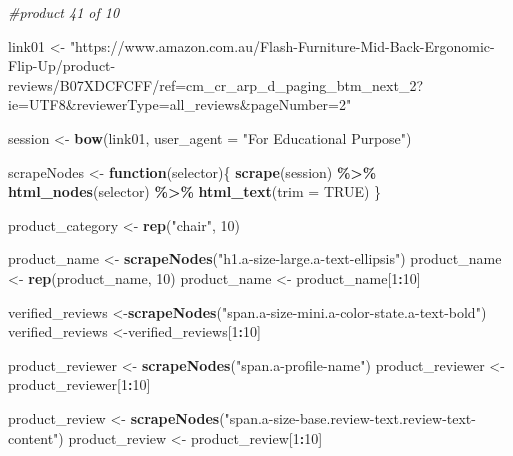 \documentclass[
]{article}
\newenvironment{Shaded}{\begin{snugshade}}{\end{snugshade}}
\newcommand{\AttributeTok}[1]{\textcolor[rgb]{0.13,0.29,0.53}{#1}}
\newcommand{\CommentTok}[1]{\textcolor[rgb]{0.56,0.35,0.01}{\textit{#1}}}
\newcommand{\ConstantTok}[1]{\textcolor[rgb]{0.56,0.35,0.01}{#1}}
\newcommand{\ControlFlowTok}[1]{\textcolor[rgb]{0.13,0.29,0.53}{\textbf{#1}}}
\newcommand{\DecValTok}[1]{\textcolor[rgb]{0.00,0.00,0.81}{#1}}
\newcommand{\FunctionTok}[1]{\textcolor[rgb]{0.13,0.29,0.53}{\textbf{#1}}}
\newcommand{\NormalTok}[1]{#1}
\newcommand{\OtherTok}[1]{\textcolor[rgb]{0.56,0.35,0.01}{#1}}
\newcommand{\SpecialCharTok}[1]{\textcolor[rgb]{0.81,0.36,0.00}{\textbf{#1}}}
\newcommand{\StringTok}[1]{\textcolor[rgb]{0.31,0.60,0.02}{#1}}
\begin{document}
\begin{Shaded}
\begin{Highlighting}[]
\CommentTok{\#product 41 of 10}

\NormalTok{link01 }\OtherTok{\textless{}{-}} \StringTok{"https://www.amazon.com.au/Flash{-}Furniture{-}Mid{-}Back{-}Ergonomic{-}Flip{-}Up/product{-}reviews/B07XDCFCFF/ref=cm\_cr\_arp\_d\_paging\_btm\_next\_2?ie=UTF8\&reviewerType=all\_reviews\&pageNumber=2"}


\NormalTok{  session }\OtherTok{\textless{}{-}} \FunctionTok{bow}\NormalTok{(link01,}
               \AttributeTok{user\_agent =} \StringTok{"For Educational Purpose"}\NormalTok{)}

\NormalTok{  scrapeNodes }\OtherTok{\textless{}{-}} \ControlFlowTok{function}\NormalTok{(selector)\{}
    \FunctionTok{scrape}\NormalTok{(session) }\SpecialCharTok{\%\textgreater{}\%}
      \FunctionTok{html\_nodes}\NormalTok{(selector) }\SpecialCharTok{\%\textgreater{}\%}
      \FunctionTok{html\_text}\NormalTok{(}\AttributeTok{trim =} \ConstantTok{TRUE}\NormalTok{)}
\NormalTok{  \}}

\NormalTok{  product\_category }\OtherTok{\textless{}{-}} \FunctionTok{rep}\NormalTok{(}\StringTok{"chair"}\NormalTok{, }\DecValTok{10}\NormalTok{)}

\NormalTok{  product\_name }\OtherTok{\textless{}{-}} \FunctionTok{scrapeNodes}\NormalTok{(}\StringTok{"h1.a{-}size{-}large.a{-}text{-}ellipsis"}\NormalTok{)}
\NormalTok{  product\_name }\OtherTok{\textless{}{-}} \FunctionTok{rep}\NormalTok{(product\_name, }\DecValTok{10}\NormalTok{)}
\NormalTok{  product\_name }\OtherTok{\textless{}{-}}\NormalTok{ product\_name[}\DecValTok{1}\SpecialCharTok{:}\DecValTok{10}\NormalTok{]}
  
\NormalTok{  verified\_reviews }\OtherTok{\textless{}{-}}\FunctionTok{scrapeNodes}\NormalTok{(}\StringTok{"span.a{-}size{-}mini.a{-}color{-}state.a{-}text{-}bold"}\NormalTok{)}
\NormalTok{  verified\_reviews }\OtherTok{\textless{}{-}}\NormalTok{verified\_reviews[}\DecValTok{1}\SpecialCharTok{:}\DecValTok{10}\NormalTok{]}
  
\NormalTok{  product\_reviewer }\OtherTok{\textless{}{-}} \FunctionTok{scrapeNodes}\NormalTok{(}\StringTok{"span.a{-}profile{-}name"}\NormalTok{)}
\NormalTok{  product\_reviewer }\OtherTok{\textless{}{-}}\NormalTok{ product\_reviewer[}\DecValTok{1}\SpecialCharTok{:}\DecValTok{10}\NormalTok{]}
  
\NormalTok{  product\_review }\OtherTok{\textless{}{-}} \FunctionTok{scrapeNodes}\NormalTok{(}\StringTok{"span.a{-}size{-}base.review{-}text.review{-}text{-}content"}\NormalTok{)}
\NormalTok{  product\_review }\OtherTok{\textless{}{-}}\NormalTok{ product\_review[}\DecValTok{1}\SpecialCharTok{:}\DecValTok{10}\NormalTok{]}
  

\end{Highlighting}
\end{Shaded}
\end{document}
